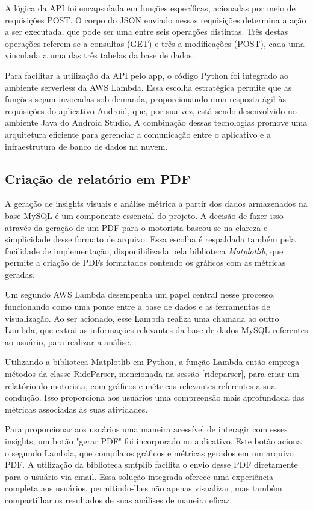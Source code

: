     A lógica da API foi encapsulada em funções específicas, acionadas por meio de requisições POST. O corpo do JSON enviado nessas requisições determina a ação a ser executada, que pode ser uma entre seis operações distintas. Três destas operações referem-se a consultas (GET) e três a modificações (POST), cada uma vinculada a uma das três tabelas da base de dados.

    Para facilitar a utilização da API pelo app, o código Python foi integrado ao ambiente serverless da AWS Lambda. Essa escolha estratégica permite que as funções sejam invocadas sob demanda, proporcionando uma resposta ágil às requisições do aplicativo Android, que, por sua vez, está sendo desenvolvido no ambiente Java do Android Studio. A combinação dessas tecnologias promove uma arquitetura eficiente para gerenciar a comunicação entre o aplicativo e a infraestrutura de banco de dados na nuvem.


    \subsection{Criação de relatório em PDF}
    
    A geração de insights visuais e análise métrica a partir dos dados armazenados na base MySQL é um componente essencial do projeto. A decisão de fazer isso através da geração de um PDF para o motorista baseou-se na clareza e simplicidade desse formato de arquivo. Essa escolha é respaldada também pela facilidade de implementação, disponibilizada pela biblioteca \textit{Matplotlib}, que permite a criação de PDFs formatados contendo os gráficos com as métricas geradas.
    
    Um segundo AWS Lambda desempenha um papel central nesse processo, funcionando como uma ponte entre a base de dados e as ferramentas de visualização. Ao ser acionado, esse Lambda realiza uma chamada ao outro Lambda, que extrai as informações relevantes da base de dados MySQL referentes ao usuário, para realizar a análise.

    Utilizando a biblioteca Matplotlib em Python, a função Lambda então emprega métodos da classe RideParser, mencionada na sessão \ref{rideparser}, para criar um relatório do motorista, com gráficos e métricas relevantes referentes a sua condução. Isso proporciona aos usuários uma compreensão mais aprofundada das métricas associadas às suas atividades.
    
    Para proporcionar aos usuários uma maneira acessível de interagir com esses insights, um botão "gerar PDF" foi incorporado no aplicativo. Este botão aciona o segundo Lambda, que compila os gráficos e métricas gerados em um arquivo PDF. A utilização da biblioteca smtplib facilita o envio desse PDF diretamente para o usuário via email. Essa solução integrada oferece uma experiência completa aos usuários, permitindo-lhes não apenas visualizar, mas também compartilhar os resultados de suas análises de maneira eficaz.    

